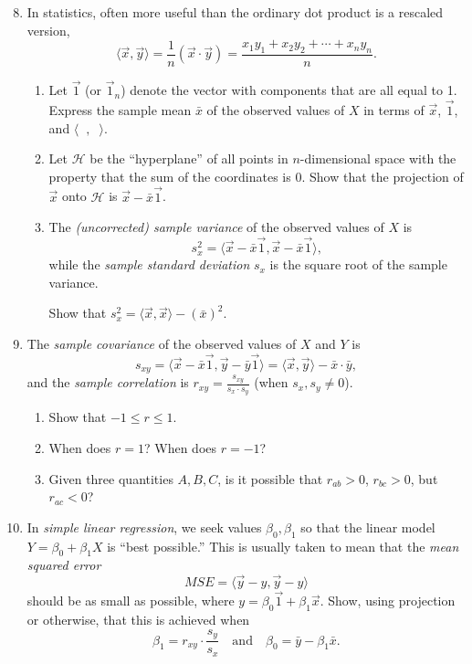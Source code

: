 \begin{enumerate}\setcounter{enumi}{7}
\item In statistics, often more useful than the ordinary dot product is a rescaled version,
\begin{equation*}
\langle\vec{x},\vec{y}\rangle = \frac{1}{n}(\vec{x}\cdot\vec{y}) = \frac{x_1y_1 + x_2y_2 + \cdots + x_ny_n}{n}.
\end{equation*}
\begin{enumerate}
\item Let $\vec{1}$ (or $\vec{1}_n$) denote the vector with components that are all equal to 1. Express the sample mean $\bar{x}$ of the observed values of $X$ in terms of $\vec{x}$, $\vec{1}$, and $\langle\phantom{x},\phantom{x}\rangle$.
\item Let $\mathcal{H}$ be the ``hyperplane'' of all points in $n$-dimensional space with the property that the sum of the coordinates is 0. Show that the projection of $\vec{x}$ onto $\mathcal{H}$ is $\vec{x} - \bar{x}\vec{1}$.
\item The \emph{(uncorrected) sample variance} of the observed values of $X$ is
\begin{equation*}
s_x^2 = \langle\vec{x} - \bar{x}\vec{1}, \vec{x} - \bar{x}\vec{1}\rangle,
\end{equation*}
while the \emph{sample standard deviation} $s_x$ is the square root of the sample variance.\par
Show that $s_x^2 = \langle\vec{x},\vec{x}\rangle - (\bar{x})^2$.
\end{enumerate}
\item The \emph{sample covariance} of the observed values of $X$ and $Y$ is
\begin{equation*}
s_{xy} = \langle\vec{x} - \bar{x}\vec{1}, \vec{y} - \bar{y}\vec{1}\rangle = \langle\vec{x},\vec{y}\rangle - \bar{x}\cdot\bar{y},
\end{equation*}
and the \emph{sample correlation} is $r_{xy} = \frac{s_{xy}}{s_x\cdot s_y}$ (when $s_x,s_y\neq 0$).
\begin{enumerate}
\item Show that $-1\leq r\leq 1$.
\item When does $r = 1$? When does $r = -1$?
\item Given three quantities $A,B,C$, is it possible that $r_{ab} > 0$, $r_{bc} > 0$, but $r_{ac} < 0$?
\end{enumerate}
\item In \emph{simple linear regression}, we seek values $\beta_0,\beta_1$ so that the linear model $Y = \beta_0 + \beta_1X$ is ``best possible.'' This is usually taken to mean that the \emph{mean squared error}
\begin{equation*}
MSE = \langle\vec{y} - \unit{y}, \vec{y} - \unit{y}\rangle
\end{equation*}
should be as small as possible, where $\unit{y} = \beta_0\vec{1} + \beta_1\vec{x}$. Show, using projection or otherwise, that this is achieved when
\begin{equation*}
\beta_1 = r_{xy}\cdot\frac{s_y}{s_x}\quad\text{and}\quad\beta_0 = \bar{y} - \beta_1\bar{x}.
\end{equation*}
\end{enumerate}


